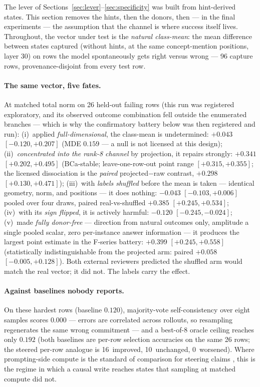 \documentclass{article} %
\begin{document}
The lever of Sections~\ref{sec:lever}--\ref{sec:specificity} was built
from hint-derived states. This section removes the hints, then the
donors, then --- in the final experiments --- the assumption that the
channel is where success itself lives. Throughout, the vector under
test is the \emph{natural class-mean}: the mean difference between
states captured (without hints, at the same concept-mention positions,
layer 30) on rows the model spontaneously gets right versus wrong ---
96 capture rows, provenance-disjoint from every test row.

\paragraph{The same vector, five fates.} At matched total norm on 26
held-out failing rows (this run was registered exploratory, and its
observed outcome combination fell outside the enumerated branches ---
which is why the confirmatory battery below was then registered and
run):
(i)~applied \emph{full-dimensional}, the class-mean is undetermined:
$+0.043$
$[-0.120, +0.207]$ (MDE $0.159$ --- a null is not licensed at this
design);
(ii)~\emph{concentrated into the rank-8 channel} by projection, it
repairs strongly: $+0.341$ $[+0.202, +0.495]$ (BCa-stable;
leave-one-row-out point range $[+0.315, +0.355]$; the licensed
dissociation is the \emph{paired} projected$-$raw contrast, $+0.298$
$[+0.130, +0.471]$);
(iii)~with \emph{labels shuffled} before the mean is taken --- identical
geometry, norm, and positions --- it does nothing: $-0.043$
$[-0.103, +0.006]$ pooled over four draws, paired real-vs-shuffled
$+0.385$ $[+0.245, +0.534]$;
(iv)~with its \emph{sign flipped}, it is actively harmful: $-0.120$
$[-0.245, -0.024]$;
(v)~made \emph{fully donor-free} --- direction from natural outcomes
only, amplitude a single pooled scalar, zero per-instance answer
information --- it produces the largest point estimate in the
F-series battery: $+0.399$ $[+0.245, +0.558]$ (statistically
indistinguishable from the projected arm: paired $+0.058$
$[-0.005, +0.128]$).
Both external reviewers predicted the shuffled arm would match the real
vector; it did not. The labels carry the effect.

\paragraph{Against baselines nobody reports.} On these hardest rows
(baseline $0.120$), majority-vote self-consistency
\citep{selfconsistency2022} over eight samples scores $0.000$ --- errors are correlated across rollouts, so resampling
regenerates the same wrong commitment --- and a best-of-8 oracle
ceiling reaches only $0.192$ (both baselines are per-row selection
accuracies on the same 26 rows; the steered per-row analogue is
16~improved, 10~unchanged, 0~worsened). Where prompting-side compute
is
the standard of comparison for steering claims \citep{axbench2025},
this is the regime in which a causal write reaches states that
sampling at matched compute did not.
\end{document}
